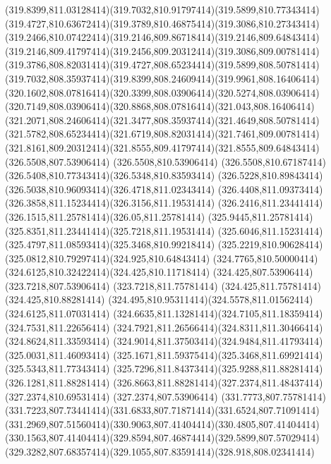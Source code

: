 {{	\curveto(319.8399,811.03128414)(319.7032,810.91797414)(319.5899,810.77343414)
	\curveto(319.4727,810.63672414)(319.3789,810.46875414)(319.3086,810.27343414)
	\curveto(319.2466,810.07422414)(319.2146,809.86718414)(319.2146,809.64843414)
	\curveto(319.2146,809.41797414)(319.2456,809.20312414)(319.3086,809.00781414)
	\curveto(319.3786,808.82031414)(319.4727,808.65234414)(319.5899,808.50781414)
	\curveto(319.7032,808.35937414)(319.8399,808.24609414)(319.9961,808.16406414)
	\curveto(320.1602,808.07816414)(320.3399,808.03906414)(320.5274,808.03906414)
	\curveto(320.7149,808.03906414)(320.8868,808.07816414)(321.043,808.16406414)
	\curveto(321.2071,808.24606414)(321.3477,808.35937414)(321.4649,808.50781414)
	\curveto(321.5782,808.65234414)(321.6719,808.82031414)(321.7461,809.00781414)
	\curveto(321.8161,809.20312414)(321.8555,809.41797414)(321.8555,809.64843414)
	\closepath
	\moveto(326.5508,807.53906414)
	\lineto(326.5508,810.53906414)
	\curveto(326.5508,810.67187414)(326.5408,810.77343414)(326.5348,810.83593414)
	\curveto(326.5228,810.89843414)(326.5038,810.96093414)(326.4718,811.02343414)
	\curveto(326.4408,811.09373414)(326.3858,811.15234414)(326.3156,811.19531414)
	\curveto(326.2416,811.23441414)(326.1515,811.25781414)(326.05,811.25781414)
	\curveto(325.9445,811.25781414)(325.8351,811.23441414)(325.7218,811.19531414)
	\curveto(325.6046,811.15231414)(325.4797,811.08593414)(325.3468,810.99218414)
	\curveto(325.2219,810.90628414)(325.0812,810.79297414)(324.925,810.64843414)
	\curveto(324.7765,810.50000414)(324.6125,810.32422414)(324.425,810.11718414)
	\lineto(324.425,807.53906414)
	\lineto(323.7218,807.53906414)
	\lineto(323.7218,811.75781414)
	\lineto(324.425,811.75781414)
	\lineto(324.425,810.88281414)
	\curveto(324.495,810.95311414)(324.5578,811.01562414)(324.6125,811.07031414)
	\curveto(324.6635,811.13281414)(324.7105,811.18359414)(324.7531,811.22656414)
	\curveto(324.7921,811.26566414)(324.8311,811.30466414)(324.8624,811.33593414)
	\curveto(324.9014,811.37503414)(324.9484,811.41793414)(325.0031,811.46093414)
	\curveto(325.1671,811.59375414)(325.3468,811.69921414)(325.5343,811.77343414)
	\curveto(325.7296,811.84373414)(325.9288,811.88281414)(326.1281,811.88281414)
	\curveto(326.8663,811.88281414)(327.2374,811.48437414)(327.2374,810.69531414)
	\lineto(327.2374,807.53906414)
	\closepath
	\moveto(331.7773,807.75781414)
	\curveto(331.7223,807.73441414)(331.6833,807.71871414)(331.6524,807.71091414)
	\curveto(331.2969,807.51560414)(330.9063,807.41404414)(330.4805,807.41404414)
	\curveto(330.1563,807.41404414)(329.8594,807.46874414)(329.5899,807.57029414)
	\curveto(329.3282,807.68357414)(329.1055,807.83591414)(328.918,808.02341414)
}}
